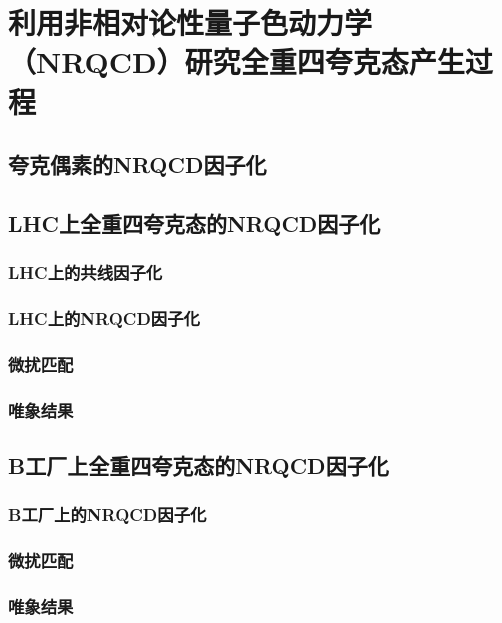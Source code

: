 \chapter{利用非相对论性量子色动力学（NRQCD）研究全重四夸克态产生过程\label{chap_Tetraquark}}

\section{夸克偶素的NRQCD因子化}

\section{LHC上全重四夸克态的NRQCD因子化}
\subsection{LHC上的共线因子化}
\subsection{LHC上的NRQCD因子化}
\subsection{微扰匹配}
\subsection{唯象结果}

\section{B工厂上全重四夸克态的NRQCD因子化}
\subsection{B工厂上的NRQCD因子化}
\subsection{微扰匹配}
\subsection{唯象结果}